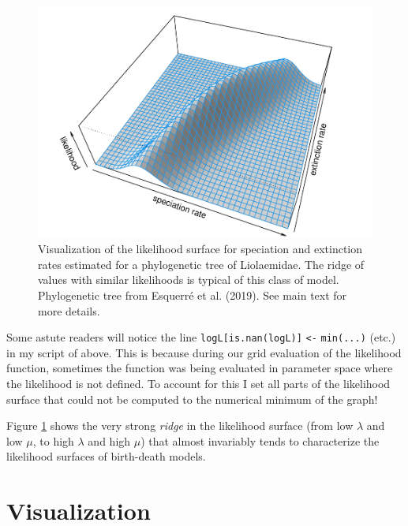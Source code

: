 \documentclass[fleqn,10pt,lineno]{wlpeerj} %
\begin{document}
\begin{figure}
\includegraphics[width=1\linewidth]{Revell.phytools-v2_peerj_files/figure-latex/liol-bd-3d-1} \caption{Visualization of the likelihood surface for speciation and extinction rates estimated for a phylogenetic tree of Liolaemidae. The ridge of values with similar likelihoods is typical of this class of model. Phylogenetic tree from Esquerr\'e et al. (2019). See main text for more details.}\label{fig:liol-bd-3d}
\end{figure}

Some astute readers will notice the line \texttt{logL{[}is.nan(logL){]}} \texttt{\textless{}-} \texttt{min(...)} (etc.) in my script of above. This is because during our grid evaluation of the likelihood function, sometimes the function was being evaluated in parameter space where the likelihood is not defined. To account for this I set all parts of the likelihood surface that could not be computed to the numerical minimum of the graph!

Figure \ref{fig:liol-bd-3d} shows the very strong \emph{ridge} in the likelihood surface (from low \(\lambda\) and low \(\mu\), to high \(\lambda\) and high \(\mu\)) that almost invariably tends to characterize the likelihood surfaces of birth-death models.

\hypertarget{visualization}{%
\section{Visualization}\label{visualization}}
\end{document}
